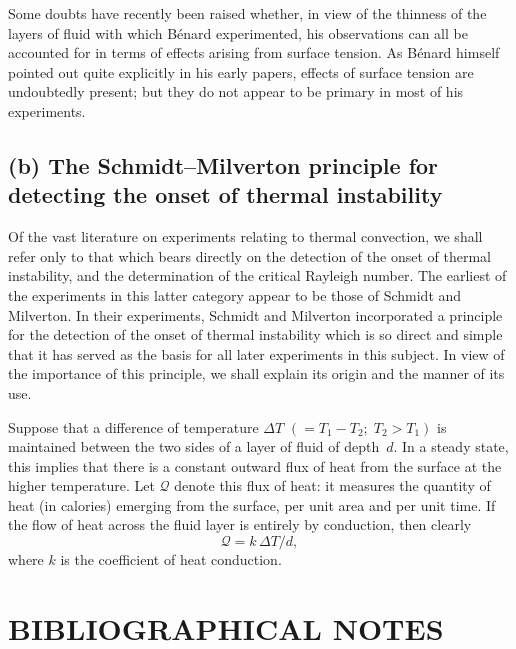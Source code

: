 Some doubts have recently been raised whether, in view of the thinness
of the layers of fluid with which B\'enard experimented, his observations
can all be accounted for in terms of effects arising from surface
tension.  As B\'enard himself pointed out quite explicitly in his early papers,
effects of surface tension are undoubtedly present; but they do not
appear to be primary in most of his experiments.


\subsection*{(b) The Schmidt--Milverton principle for detecting the onset of thermal instability}

Of the vast literature on experiments relating to thermal convection,
we shall refer only to that which bears directly on the detection of the
onset of thermal instability, and the determination of the critical
Rayleigh number.  The earliest of the experiments in this latter category
appear to be those of Schmidt and Milverton.  In their experiments,
Schmidt and Milverton incorporated a principle for the detection of the
onset of thermal instability which is so direct and simple that it has
served as the basis for all later experiments in this subject.  In view of
the importance of this principle, we shall explain its origin and the
manner of its use.

Suppose that a difference of temperature $\Delta T$ $(= T_1 - T_2;\; T_2 > T_1)$
is maintained between the two sides of a layer of fluid of depth~$d$.  In a
steady state, this implies that there is a constant outward flux of heat
from the surface at the higher temperature.  Let $\mathscr{Q}$ denote this flux
of heat: it measures the quantity of heat (in calories) emerging from the
surface, per unit area and per unit time.  If the flow of heat across the
fluid layer is entirely by conduction, then clearly
\begin{equation}
\label{eq:2-323}
\mathscr{Q} = k\,\Delta T / d,
\end{equation}
where $k$ is the coefficient of heat conduction.

\section*{BIBLIOGRAPHICAL NOTES}

